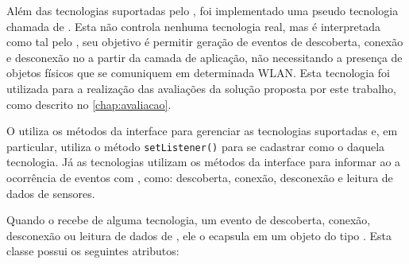 Além das tecnologias suportadas pelo \mhub, foi implementado uma pseudo tecnologia chamada de \faketechnology.
Esta não controla nenhuma tecnologia real, mas é interpretada como tal pelo \stwopa, seu objetivo é permitir geração de eventos de descoberta, conexão e desconexão no \stwopa a partir da camada de aplicação, não necessitando a presença de objetos físicos que se comuniquem em determinada WLAN.
Esta tecnologia foi utilizada para a realização das avaliações da solução proposta por este trabalho, como descrito no \autoref{chap:avaliacao}.

O \stwopaservice utiliza os métodos da interface \techinterface para gerenciar as tecnologias suportadas e, em particular, utiliza o método \texttt{setListener()} para se cadastrar como o \listener daquela tecnologia. Já as tecnologias utilizam os métodos da interface \techlistener para informar ao \stwopaservice a ocorrência de eventos com \smartobjs, como: descoberta, conexão, desconexão e leitura de dados de sensores.

Quando o \stwopaservice recebe de alguma tecnologia, um evento de descoberta, conexão, desconexão ou leitura de dados de \smartobjs, ele o ecapsula em um objeto do tipo \sensordata.
Esta classe possui os seguintes atributos:

